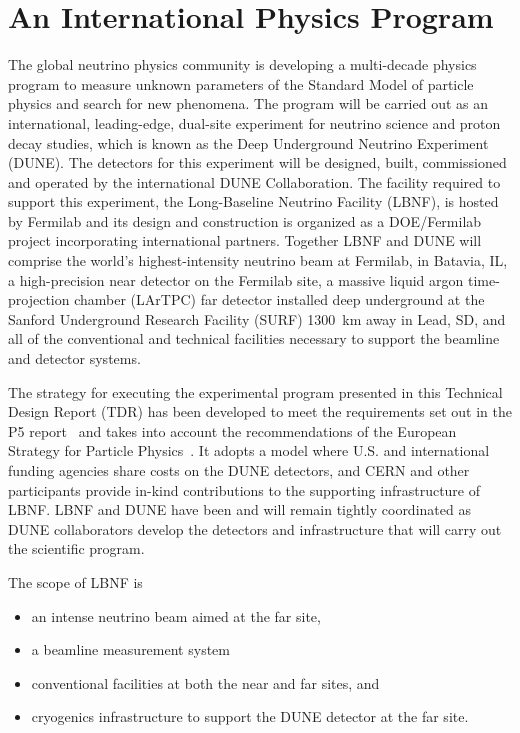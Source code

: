 
\section{An International Physics Program}

The global neutrino physics community is developing a multi-decade
physics program to measure unknown parameters of the Standard Model of
particle physics and search for new phenomena.  The program will be carried out as an international,
leading-edge, dual-site experiment for neutrino science and proton decay studies, which 
is known as the Deep Underground Neutrino Experiment (DUNE).
The detectors for this experiment will be designed, built, commissioned and operated by the international DUNE Collaboration. The facility required to support this experiment, the Long-Baseline Neutrino Facility (LBNF), is hosted by Fermilab and its design and construction is organized as a DOE/Fermilab project incorporating international partners. Together LBNF and DUNE will comprise the world's highest-intensity neutrino beam at Fermilab, in Batavia, IL, a high-precision near detector on the Fermilab site, a massive liquid argon time-projection chamber (LArTPC) far detector installed deep underground at the Sanford Underground Research Facility (SURF) \SI{1300}{\km} away in Lead, SD, and all of the conventional and technical facilities necessary to support the beamline and detector systems. 


The strategy for executing the experimental program presented in this Technical
Design Report (TDR) has been developed to meet the requirements 
set out in the P5 report~\cite{p5report} and takes into account the recommendations of the European Strategy for Particle Physics~\cite{ESPP-2012}. It adopts a model where U.S. and international funding agencies 
share costs on the DUNE detectors, and CERN and other participants provide in-kind contributions 
to the supporting infrastructure of LBNF. LBNF and DUNE have been and will remain tightly coordinated as DUNE collaborators 
develop the detectors and infrastructure that will carry out the scientific program.
  
The scope of LBNF is
\begin{itemize}
\item an intense neutrino beam aimed at the far site,
\item a beamline measurement system
\item conventional facilities at both the near and far sites, and
\item cryogenics infrastructure to support the DUNE detector at the far site.
\end{itemize}

